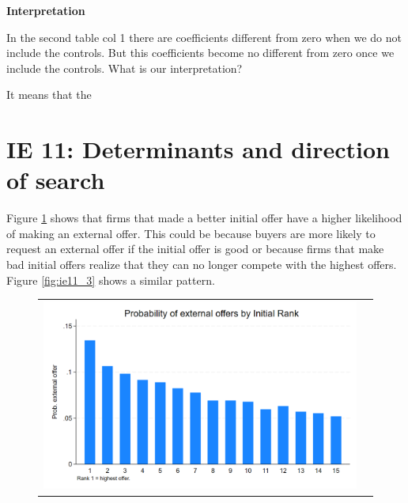 \documentclass[12pt]{article}
\begin{document}
\newpage 











\textbf{Interpretation} 

In the second table col 1 there are coefficients different from zero when we do not include the controls. But this coefficients become no different from zero once we include the controls. 
What is our interpretation? 

It means that the 



\newpage

\section{IE 11: Determinants and direction of search} 

Figure \ref{fig:ie11_1} shows that firms that made a better initial offer have a higher likelihood of making an external offer. This could be because buyers are more likely to request an external offer if the initial offer is good or because firms that make bad initial offers realize that they can no longer compete with the highest offers. Figure \ref{fig:ie11_3} shows a similar pattern. 
 

\begin{figure}[H]
\caption{}
\label{fig:ie11_1}
\centering{}%
\begin{tabular}{cc}
\includegraphics[scale=0.27]{../figures/IE11/IE11_bar_external_by_ranking.png} 
\end{tabular}
\end{figure}
\end{document}
